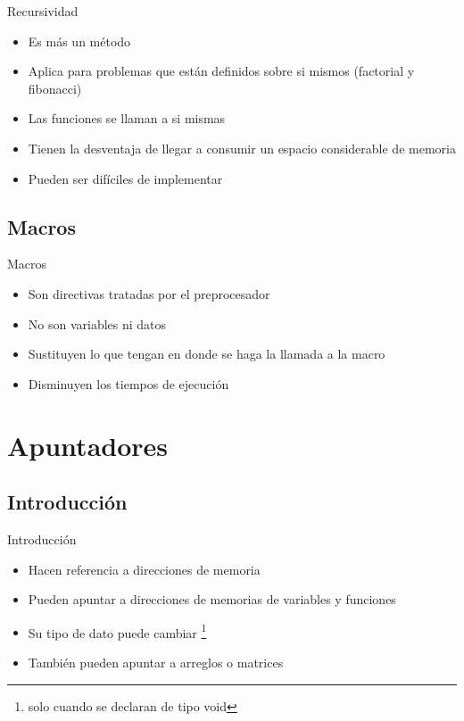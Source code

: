 \documentclass{beamer}
\begin{document}
\begin{frame}{Recursividad}
	\begin{itemize}
		\item Es m\'as un m\'etodo
		\item Aplica para problemas que est\'an definidos sobre si mismos (factorial y fibonacci)
		\item Las funciones se llaman a si mismas
		\item Tienen la desventaja de llegar a consumir un espacio considerable de memoria
		\item Pueden ser dif\'iciles de implementar
	\end{itemize}
	\centering
\end{frame}

\subsection{Macros}
\begin{frame}{Macros}
	\begin{itemize}
		\item Son directivas tratadas por el preprocesador
		\item No son variables ni datos
		\item Sustituyen lo que tengan en donde se haga la llamada a la macro
		\item Disminuyen los tiempos de ejecuci\'on
	\end{itemize}
\end{frame}


\section{Apuntadores}

\subsection{Introducci\'on}

\begin{frame}{Introducci\'on}
	\begin{itemize}
		\item Hacen referencia a direcciones de memoria
		\item Pueden apuntar a direcciones de memorias de variables y funciones
		\item Su tipo de dato puede cambiar \footnote{solo cuando se declaran de tipo void}
		\item Tambi\'en pueden apuntar a arreglos o matrices
	\end{itemize}
\end{frame}
\end{document}
